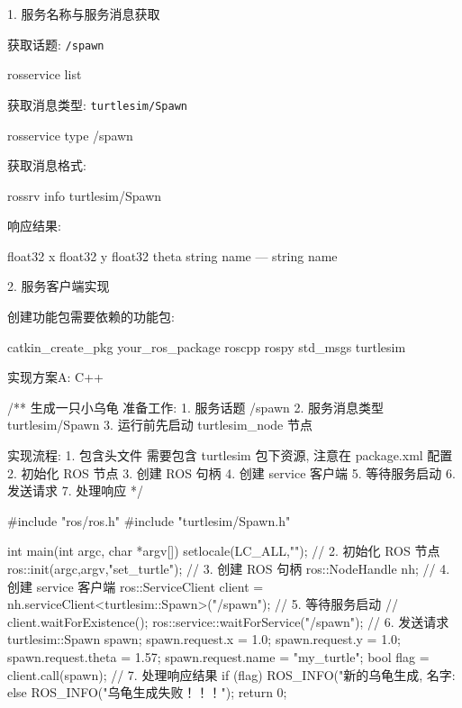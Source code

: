 \documentclass[openany, fontset=windowsold]{ctexbook}
\theoremstyle{kaiti}
\theoremstyle{normal}
\begin{document}
1. 服务名称与服务消息获取

获取话题: \verb|/spawn|

\begin{bash}
  rosservice list
\end{bash}

获取消息类型: \verb|turtlesim/Spawn|

\begin{bash}
  rosservice type /spawn
\end{bash}

获取消息格式:

\begin{bash}
  rossrv info turtlesim/Spawn
\end{bash}

响应结果:

\begin{bash}
  float32 x
  float32 y
  float32 theta
  string name
  ---
  string name
\end{bash}

2. 服务客户端实现

创建功能包需要依赖的功能包:

\begin{bash}
  catkin_create_pkg your_ros_package roscpp rospy std_msgs turtlesim
\end{bash}

实现方案A: C++

\begin{cpp}
  /**
      生成一只小乌龟
      准备工作:
          1. 服务话题 /spawn
          2. 服务消息类型 turtlesim/Spawn
          3. 运行前先启动 turtlesim_node 节点

      实现流程:
          1. 包含头文件
            需要包含 turtlesim 包下资源, 注意在 package.xml 配置
          2. 初始化 ROS 节点
          3. 创建 ROS 句柄
          4. 创建 service 客户端
          5. 等待服务启动
          6. 发送请求
          7. 处理响应
   */

  #include "ros/ros.h"
  #include "turtlesim/Spawn.h"

  int main(int argc, char *argv[])
  {
      setlocale(LC_ALL,"");
      // 2. 初始化 ROS 节点
      ros::init(argc,argv,"set_turtle");
      // 3. 创建 ROS 句柄
      ros::NodeHandle nh;
      // 4. 创建 service 客户端
      ros::ServiceClient client = nh.serviceClient<turtlesim::Spawn>("/spawn");
      // 5. 等待服务启动
      // client.waitForExistence();
      ros::service::waitForService("/spawn");
      // 6. 发送请求
      turtlesim::Spawn spawn;
      spawn.request.x = 1.0;
      spawn.request.y = 1.0;
      spawn.request.theta = 1.57;
      spawn.request.name = "my_turtle";
      bool flag = client.call(spawn);
      // 7. 处理响应结果
      if (flag)
      {
          ROS_INFO("新的乌龟生成, 名字:%
      } else {
          ROS_INFO("乌龟生成失败！！！");
      }
      return 0;
  }
\end{cpp}
\end{document}
